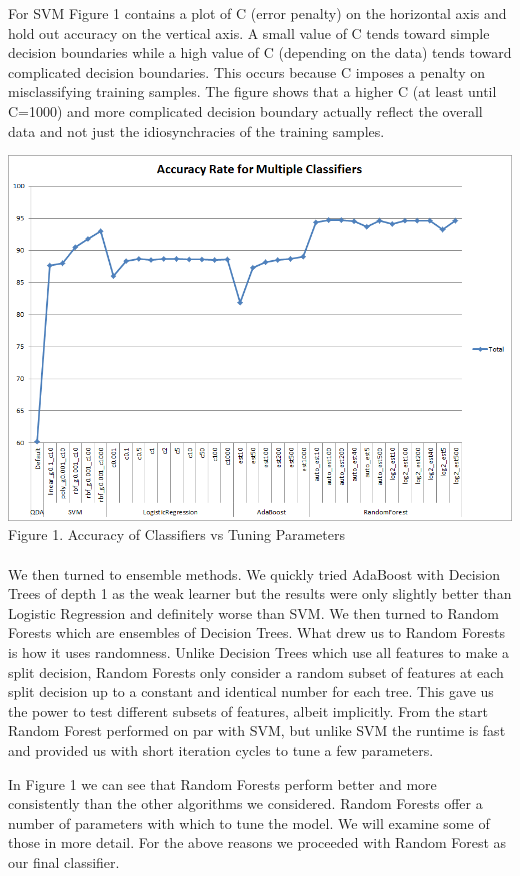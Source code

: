 \documentclass[twoside,11pt]{homework}
\begin{document}
For SVM Figure 1 contains a plot of C (error penalty) on the horizontal axis and hold out accuracy on the vertical axis.
A small value of C tends toward simple decision boundaries while a high value of C (depending on the data) tends toward complicated
decision boundaries. This occurs because C imposes a penalty on misclassifying training samples.
The figure shows that a higher C (at least until C=1000) and more complicated decision boundary actually reflect the overall data
and not just the idiosynchracies of the training samples.

\includegraphics[scale=0.5]{classifiers.png}
\\
Figure 1. Accuracy of Classifiers vs Tuning Parameters
\\
\\
We then turned to ensemble methods. We quickly tried AdaBoost with Decision 
Trees of depth 1 as the weak learner but the results were only slightly better than 
Logistic Regression and definitely worse than SVM. We then turned to Random 
Forests which are ensembles of Decision Trees. What drew us to Random Forests is 
how it uses randomness. Unlike Decision Trees which use all features to make a split 
decision, Random Forests only consider a random subset of features at each split decision up to
a constant and identical number for each tree.
This gave us the power to test different subsets of features, albeit implicitly. From the start Random 
Forest performed on par with SVM, but unlike SVM the runtime is fast and provided 
us with short iteration cycles to tune a few parameters. 

In Figure 1 we can see that Random Forests perform better and more
consistently than the other algorithms we considered. Random Forests offer a number of parameters with which 
to tune the model. We will examine some of those in more detail. For the above reasons we proceeded with
Random Forest as our final classifier.
\end{document}
